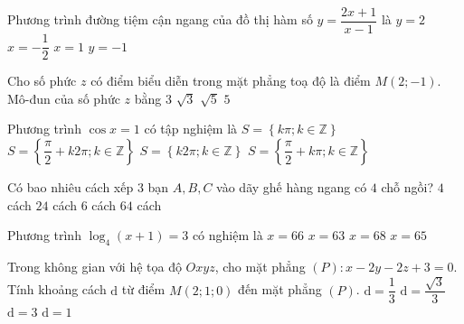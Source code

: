 	\begin{ex}%
		Phương trình đường tiệm cận ngang của đồ thị hàm số $y=\dfrac{2x+1}{x-1}$ là
		\choice 
		{\True $y=2$}
		{$x=-\dfrac{1}{2}$}
		{$x=1$}
		{$y=-1$}
	\end{ex}
	
	\begin{ex}%
		Cho số phức $z$ có điểm biểu diễn trong mặt phẳng toạ độ là điểm $M(2; -1)$. Mô-đun của số phức $z$ bằng
		\choice
		{$3$}
		{$\sqrt{3}$}
		{\True $\sqrt{5}$}
		{$5$}
	\end{ex}
	
	\begin{ex}%
		Phương trình $\cos x=1$ có tập nghiệm là
		\choice
		{$S=\left\{k\pi; k\in \mathbb{Z}\right\}$}
		{$S=\left\{\dfrac{\pi}{2}+k2\pi; k\in \mathbb{Z}\right\}$}
		{\True $S=\left\{k2\pi; k\in \mathbb{Z}\right\}$}
		{$S=\left\{\dfrac{\pi}{2}+k\pi; k\in \mathbb{Z}\right\}$}
	\end{ex}
	
	
	\begin{ex}%
		Có bao nhiêu cách xếp $3$ bạn $A, B, C$ vào dãy ghế hàng ngang có $4$ chỗ ngồi?
		\choice
		{$4$ cách}  
		{\True $24$ cách}  
		{$6$ cách}  
		{$64$ cách}
	\end{ex}
	
	\begin{ex}%
		Phương trình $\log_4(x+1)=3$ có nghiệm là
		\choice
		{$x=66$}  
		{\True $x=63$}  
		{$x=68$}  
		{$x=65$}
	\end{ex}
	
	\begin{ex}%
		Trong không gian với hệ tọa độ $Oxyz$, cho mặt phẳng $(P)\colon x-2y-2z+3=0$. Tính khoảng cách $\mathrm{d}$ từ điểm $M(2;1;0)$ đến mặt phẳng $(P)$.
		\choice
		{$\mathrm{d}=\dfrac{1}{3}$} 
		{$\mathrm{d}=\dfrac{\sqrt{3}}{3}$} 
		{$\mathrm{d}=3$} 
		{\True $\mathrm{d}=1$} 
	\end{ex}	
	
